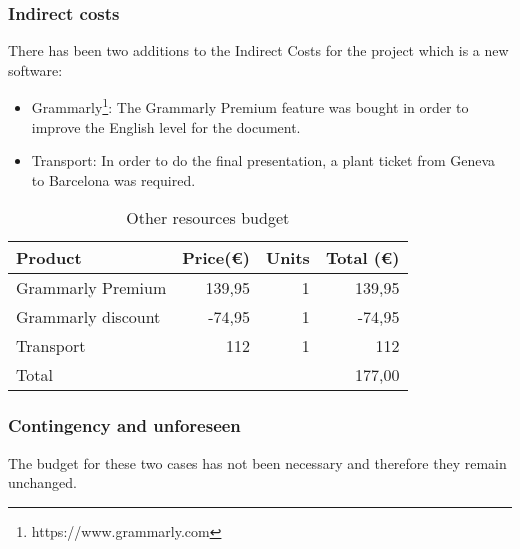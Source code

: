 \subsubsection{Indirect costs}
There has been two additions to the Indirect Costs for the project which is a new software: 
\begin{itemize}
	\item Grammarly\footnote{https://www.grammarly.com}: The Grammarly Premium feature was bought in order to improve the English level for the document.
	\item Transport: In order to do the final presentation, a plant ticket from Geneva to Barcelona was required.
\end{itemize}


\begin{table}[h!]
	\centering
	\begin{tabular}{|l|r|r|r|}
		\hline
		\multicolumn{1}{|l|}{Product} & \multicolumn{1}{l|}{Price(€)} & \multicolumn{1}{l|}{Units} & \multicolumn{1}{l|}{Total (€)} \\ \hline
		Grammarly Premium & 139,95  &1& 139,95\\ \hline
		Grammarly discount & -74,95 &1 & -74,95\\ \hline
		Transport & 112 & 1 & 112\\ \hline
		Total & \multicolumn{3}{r|}{177,00}                                                                        \\ \hline
	\end{tabular}
	\caption{Other resources budget}
	\label{indirect-cost-addition}
\end{table}

\subsubsection{Contingency and unforeseen}
The budget for these two cases has not been necessary and therefore they remain unchanged.
